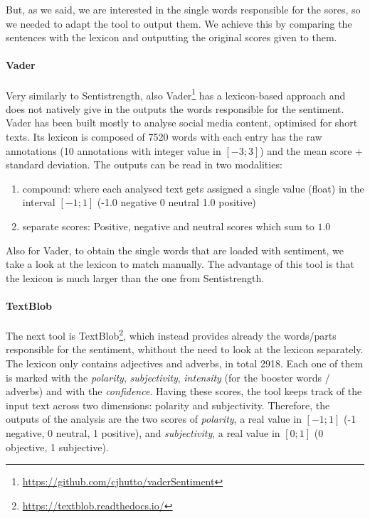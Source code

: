 But, as we said, we are interested in the single words responsible for the sores, so we needed to adapt the tool to output them. We achieve this by comparing the sentences with the lexicon and outputting the original scores given to them.


\paragraph{Vader}
Very similarly to Sentistrength, also Vader\footnote{\url{https://github.com/cjhutto/vaderSentiment}} has a lexicon-based approach and does not natively give in the outputs the words responsible for the sentiment. Vader has been built mostly to analyse social media content, optimised for short texts.
Its lexicon is composed of 7520 words with each entry has the raw annotations (10 annotations with integer value in $[-3;3]$) and the mean score + standard deviation.
The outputs can be read in two modalities:
\begin{enumerate}
    \item compound: where each analysed text gets assigned a single value (float) in the interval $[-1;1]$ (-1.0 negative 0 neutral 1.0 positive)
    \item separate scores: Positive, negative and neutral scores which sum to $1.0$
\end{enumerate}

Also for Vader, to obtain the single words that are loaded with sentiment, we take a look at the lexicon to match manually. The advantage of this tool is that the lexicon is much larger than the one from Sentistrength.



\paragraph{TextBlob}
The next tool is TextBlob\footnote{\url{ https://textblob.readthedocs.io/}}, which instead provides already the words/parts responsible for the sentiment, whithout the need to look at the lexicon separately.
The lexicon only contains adjectives and adverbs, in total 2918. Each one of them is marked with the \emph{polarity}, \emph{subjectivity}, \emph{intensity} (for the booster words / adverbs) %
and with the \emph{confidence}. Having these scores, the tool keeps track of the input text across two dimensions: polarity and subjectivity.
Therefore, the outputs of the analysis are the two scores of \emph{polarity}, a real value in $[-1;1]$ (-1 negative, 0 neutral, 1 positive), and \emph{subjectivity}, a real value in $[0;1]$ (0 objective, 1 subjective).

